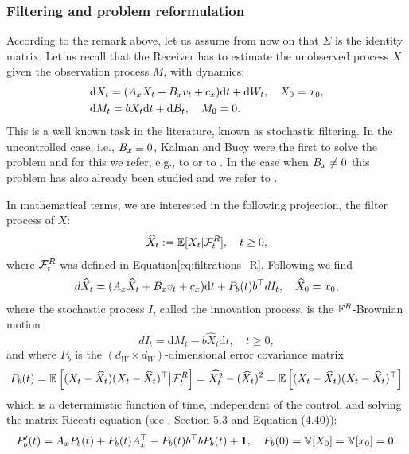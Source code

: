 \documentclass[a4paper,10pt]{article}
\def \V{\mathbb{V}}
\newcommand{\EE}{\mathbb{E}}
\newcommand{\D}{\mathrm{d}}
\newcommand{\Ff}{\mathcal{F}}
\def \V{\mathbb{V}}
\theoremstyle{definition}
\theoremstyle{plain}
\numberwithin{equation}{section}
\begin{document}
\subsubsection{Filtering and problem reformulation}
According to the remark above, let us assume from now on that $\Sigma$ is the identity matrix. Let us recall that the Receiver has to estimate the unobserved process $X$ given the observation process $M$, with dynamics:
\begin{align}	
	& \D X_t = (A_{\rm x} X_t + B_{\rm x} v_t + c_{\rm x})\D t +  \D W_t , \quad X_0=x_0,  \\
	& \D M_t = b X_t \D t +  \D B_t, \quad M_0=0. 
\end{align}
This is a well known task in the literature, known as stochastic filtering. In the uncontrolled case, i.e., $B_{\rm x} \equiv 0$, Kalman and Bucy were the first to solve the problem and for this we refer, e.g., to \cite{Kalman63} or to \cite[Section 4.4]{Davis_book}. In the case when $B_{\rm x} \neq 0$ this problem has also already been studied and we refer to \cite[Section 5.3]{Davis_book}.

In mathematical terms, we are interested in the following projection, the filter process of $X$:
\begin{align}
    \widehat{X}_t := \EE[X_t | \mathcal{F}_t^{\rm R}], \quad t \ge 0,
\end{align}
where $\mathcal F_t^{\rm R}$ was defined in Equation\eqref{eq:filtrations_R}. 
Following \cite[Equation (5.49)]{Davis_book} we find
\begin{align} \label{dynobs-gen}
    d\widehat X_t  = (A_{\rm x} \widehat X_t + B_{\rm x} v_t + c_{\rm x}) \D t +  P_{b} (t) b^\top dI_t, \quad \widehat X_0 = x_0,
\end{align}
where the stochastic process $I$, called the innovation process, is the $\mathbb F^{\rm R}$-Brownian motion
$$
dI_t  = \D M_t - b \widehat X_t \D t, \quad t \ge 0,
$$
and where $P_b$ is the $(d_W \times d_W)$-dimensional error covariance matrix
\begin{equation}\label{eq:P_b}
P_b (t) = \EE \left[ (X_t -\widehat{X}_t) (X_t -\widehat{X}_t)^\top \big| \Ff^{\rm R}_t \right] = \widehat{X^2 _t}- (\widehat{X}_t)^2 = \EE \left[ (X_t -\widehat{X}_t)(X_t -\widehat{X}_t)^\top \right]  
\end{equation}
which is a deterministic function of time, independent of the control, and solving the matrix Riccati equation (see \cite{Davis_book}, Section 5.3 and Equation (4.40)):
\begin{equation}\label{eq:ODE_P}
 P'_b (t) = A_{\rm x} P_{b}(t) + P_{b}(t) A_{\rm x}^\top - P_{b}(t) b^\top  b P_{b}(t) + \mathbf{1}, \quad P_{b}(0) = \V[X_0]=\V[x_0] = 0.
\end{equation}
\end{document}

